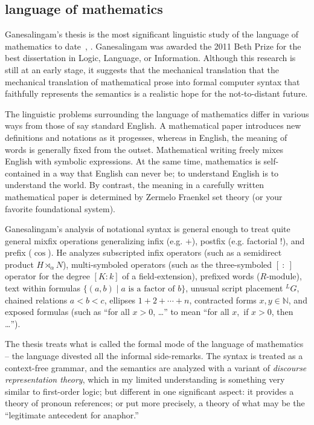 \documentclass{llncs}
\newcommand{\ring}[1]{\mathbb{#1}}
\begin{document}
\subsection{language of mathematics}


Ganesalingam's thesis is the most significant linguistic study of the
language of mathematics to date~\cite{Gan09}, \cite{Gan10}.
Ganesalingam was awarded the 2011 Beth Prize for the best dissertation
in Logic, Language, or Information.  Although this research is still
at an early stage, it suggests that the mechanical translation that
the mechanical translation of mathematical prose into formal computer
syntax that faithfully represents the semantics is a realistic hope
for the not-to-distant future.



The linguistic problems surrounding the language of mathematics differ
in various ways  from those of say standard English.  A
mathematical paper introduces new definitions and notations as it
progesses, whereas in English, the meaning of words is generally
fixed from the outset.  Mathematical writing freely mixes
English with symbolic expressions.  At the same time, mathematics is
self-contained in a way that English can never be; to understand
English is to understand the world.  By contrast, the
meaning in a carefully written mathematical
paper is determined by Zermelo Fraenkel set theory (or your
favorite foundational system).

Ganesalingam's analysis of notational syntax is general enough to treat quite
general mixfix operations generalizing 
infix (e.g. +), postfix (e.g. factorial !), and prefix ($\cos$).  
He analyzes subscripted infix
operators (such as a semidirect product $H\rtimes_\alpha N$),
multi-symboled operators (such as the three-symboled $[~:~]$ operator
for the degree $[K:k]$ of a field-extension), prefixed words
($R$-module), text within formulas $\{(a,b) \mid a \text{~is a factor
  of~} b\}$, unusual script placement ${}^LG$, chained relations
$a<b<c$, ellipses $1+2+\cdots+n$, contracted forms $x,y\in\ring{N}$,
and exposed formulas (such as ``for all $x>0$, \dots'' to mean ``for
all $x$,~if $x>0$, then \dots'').

The thesis treats what is called the formal mode of the language of
mathematics -- the language divested all the informal side-remarks.  The
syntax is treated as a context-free grammar, and the semantics are
analyzed with a variant of {\it discourse representation theory}, which in
my limited understanding is something very similar to first-order
logic; but different in one significant aspect: it provides a theory
of pronoun references; or put more precisely, a theory of what may be
the ``legitimate antecedent for anaphor.''
\end{document}
